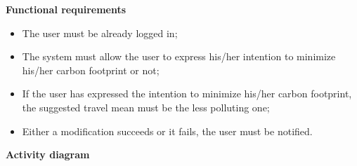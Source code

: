\documentclass{article}
\begin{document}
	\bigskip
	\noindent
	\textbf{Functional requirements} \\
	\begin{itemize}
		\item The user must be already logged in;
		\item The system must allow the user to express his/her intention to minimize his/her carbon footprint or not;
		\item If the user has expressed the intention to minimize his/her carbon footprint, the suggested travel mean must be the less polluting one;
		\item Either a modification succeeds or it fails, the user must be notified.
	\end{itemize}
	
	\newpage
	\noindent
	\textbf{Activity diagram} \\
	
\end{document}

